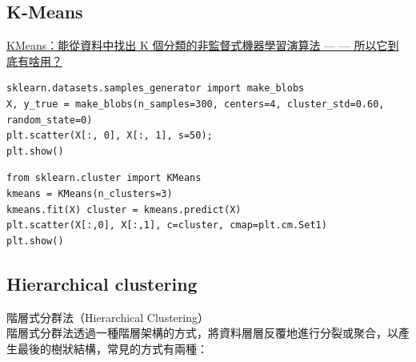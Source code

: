 \documentclass[a4paper,12pt]{article}
\begin{document}
\subsection{K-Means}
\label{sec:orgacda78c}
\href{https://alankrantas.medium.com/kmeans-\%E8\%83\%BD\%E5\%BE\%9E\%E8\%B3\%87\%E6\%96\%99\%E4\%B8\%AD\%E6\%89\%BE\%E5\%87\%BA-k-\%E5\%80\%8B\%E5\%88\%86\%E9\%A1\%9E\%E7\%9A\%84\%E9\%9D\%9E\%E7\%9B\%A3\%E7\%9D\%A3\%E5\%BC\%8F\%E6\%A9\%9F\%E5\%99\%A8\%E5\%AD\%B8\%E7\%BF\%92\%E6\%BC\%94\%E7\%AE\%97\%E6\%B3\%95-\%E6\%89\%80\%E4\%BB\%A5\%E5\%AE\%83\%E5\%88\%B0\%E5\%BA\%95\%E6\%9C\%89\%E5\%95\%A5\%E7\%94\%A8-\%E4\%BD\%BF\%E7\%94\%A8-scikit-learn-\%E8\%88\%87-python-5dd8c0c8b167}{KMeans：能從資料中找出 K 個分類的非監督式機器學習演算法 — — 所以它到底有啥用？}\\
\lstset{breaklines=true,language=Python,label= ,caption= ,captionpos=b,firstnumber=1,numbers=left}
\begin{lstlisting}
sklearn.datasets.samples_generator import make_blobs
X, y_true = make_blobs(n_samples=300, centers=4, cluster_std=0.60, random_state=0)
plt.scatter(X[:, 0], X[:, 1], s=50);
plt.show() 
\end{lstlisting}

\lstset{breaklines=true,language=Python,label= ,caption= ,captionpos=b,firstnumber=1,numbers=left}
\begin{lstlisting}
from sklearn.cluster import KMeans 
kmeans = KMeans(n_clusters=3) 
kmeans.fit(X) cluster = kmeans.predict(X) 
plt.scatter(X[:,0], X[:,1], c=cluster, cmap=plt.cm.Set1) 
plt.show()
\end{lstlisting}

\subsection{Hierarchical clustering}
\label{sec:org4621041}
階層式分群法（Hierarchical Clustering）\\
階層式分群法透過一種階層架構的方式，將資料層層反覆地進行分裂或聚合，以產生最後的樹狀結構，常見的方式有兩種：\\
\end{document}
